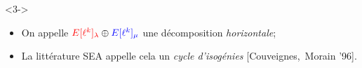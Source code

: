 \documentclass[10pt,a4paper]{beamer}
\theoremstyle{plain}
\theoremstyle{definition}
\theoremstyle{definition}
\theoremstyle{definition}
\theoremstyle{definition}
\theoremstyle{remark}
\theoremstyle{remark}
\def\red#1{\textcolor{red}{#1}}
\def\blu#1{\textcolor{blue}{#1}}
\begin{document}
\begin{frame}
\begin{figure}[h]
\begin{center}
    \end{center}
  \end{figure}
\vspace{-4.5mm}
  \begin{uncoverenv}<3->
    \begin{itemize}
    \item On appelle $\red{E[\ell^k]_\lambda}\oplus\blu{E[\ell^k]_\mu}$ une
     décomposition \emph{horizontale};
    \item La littérature SEA appelle cela un \emph{cycle d'isogénies} [Couveignes,~Morain '96].%
    \end{itemize}
  \end{uncoverenv}

\end{frame}

\end{document}
